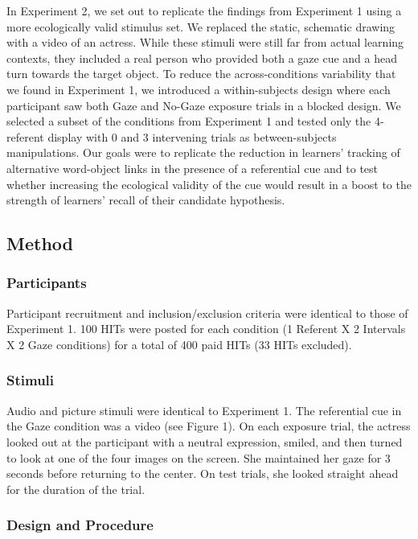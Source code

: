 \documentclass[oneside]{report}
\begin{document}
In Experiment 2, we set out to replicate the findings from Experiment 1
using a more ecologically valid stimulus set. We replaced the static,
schematic drawing with a video of an actress. While these stimuli were
still far from actual learning contexts, they included a real person who
provided both a gaze cue and a head turn towards the target object. To
reduce the across-conditions variability that we found in Experiment 1,
we introduced a within-subjects design where each participant saw both
Gaze and No-Gaze exposure trials in a blocked design. We selected a
subset of the conditions from Experiment 1 and tested only the
4-referent display with 0 and 3 intervening trials as between-subjects
manipulations. Our goals were to replicate the reduction in learners'
tracking of alternative word-object links in the presence of a
referential cue and to test whether increasing the ecological validity
of the cue would result in a boost to the strength of learners' recall
of their candidate hypothesis.

\subsection{Method}\label{method-1}

\subsubsection{Participants}\label{participants-1}

Participant recruitment and inclusion/exclusion criteria were identical
to those of Experiment 1. 100 HITs were posted for each condition (1
Referent X 2 Intervals X 2 Gaze conditions) for a total of 400 paid HITs
(33 HITs excluded).

\subsubsection{Stimuli}\label{stimuli-2}

Audio and picture stimuli were identical to Experiment 1. The
referential cue in the Gaze condition was a video (see Figure 1). On
each exposure trial, the actress looked out at the participant with a
neutral expression, smiled, and then turned to look at one of the four
images on the screen. She maintained her gaze for 3 seconds before
returning to the center. On test trials, she looked straight ahead for
the duration of the trial.

\subsubsection{Design and Procedure}\label{design-and-procedure-1}
\end{document}
